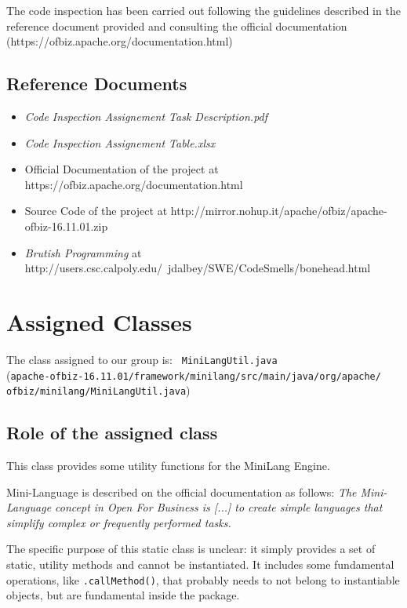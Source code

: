 \documentclass[11pt]{article} %
\begin{document}
The code inspection has been carried out following the guidelines described in the reference document provided and consulting the official documentation \\ (https://ofbiz.apache.org/documentation.html) 

\subsection{Reference Documents}
\begin{itemize}
	\item \textit{Code Inspection Assignement Task Description.pdf}
	\item \textit{Code Inspection Assignement Table.xlsx}
	\item Official Documentation of the project at https://ofbiz.apache.org/documentation.html
	\item Source Code of the project at http://mirror.nohup.it/apache/ofbiz/apache-ofbiz-16.11.01.zip
	\item \textit{Brutish Programming} at 
http://users.csc.calpoly.edu/~jdalbey/SWE/CodeSmells/bonehead.html
\end{itemize}


\section{Assigned Classes}

The class assigned to our group is:  \texttt{ {\large MiniLangUtil.java} }  \hfill\\
(\texttt{apache-ofbiz-16.11.01/framework/minilang/src/main/java/org/apache/ \\ 
ofbiz/minilang/MiniLangUtil.java})

\subsection{Role of the assigned class}
This class provides some utility functions for the MiniLang Engine.

Mini-Language is described on the official documentation as follows: \textit{The Mini-Language concept in Open For Business is [...] to create simple languages that simplify complex or frequently performed tasks.}

The specific purpose of this static class is unclear: it simply provides a set of static, utility methods and cannot be instantiated. It includes some fundamental operations, like \texttt{.callMethod()}, that probably needs to not belong to instantiable objects, but are fundamental inside the package.
\end{document}

